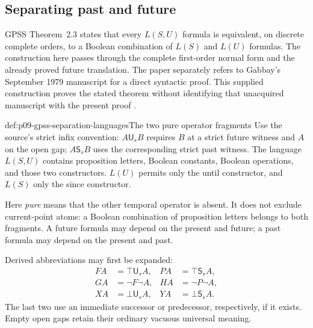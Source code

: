 
\subsection{Separating past and future}
\label{sec:p09-gpss-past-future-separation}

GPSS Theorem~2.3 states that every \(L(S,U)\) formula is
equivalent, on discrete complete orders, to a Boolean
combination of \(L(S)\) and \(L(U)\) formulas. The
construction here passes through the complete first-order
normal form and the already proved future translation.
The paper separately refers to Gabbay's September 1979
manuscript for a direct syntactic proof. This supplied
construction proves the stated theorem without identifying
that unacquired manuscript with the present proof
\cite[Theorem~2.3 and its referral, p.~170; reference G2, p.~173]{GabbayPnueliShelahStavi1980}.

\begin{hbdefinition}{def:p09-gpss-separation-languages}{The two pure operator fragments}
Use the source's strict infix convention:
\(A\mathbin{\mathsf U_s}B\) requires \(B\) at a
strict future witness and \(A\) on the open gap;
\(A\mathbin{\mathsf S_s}B\) uses the corresponding
strict past witness. The language \(L(S,U)\)
contains proposition letters, Boolean constants,
Boolean operations, and those two constructors.
\(L(U)\) permits only the until constructor,
and \(L(S)\) only the since constructor.

Here \emph{pure} means that the other temporal
operator is absent. It does not exclude current-point
atoms: a Boolean combination of proposition letters
belongs to both fragments. A future formula may
depend on the present and future; a past formula
may depend on the present and past.

Derived abbreviations may first be expanded:
\[
\begin{aligned}
 FA&=\top\mathbin{\mathsf U_s}A,&
 PA&=\top\mathbin{\mathsf S_s}A,\\
 GA&=\neg F\neg A,&
 HA&=\neg P\neg A,\\
 XA&=\bot\mathbin{\mathsf U_s}A,&
 YA&=\bot\mathbin{\mathsf S_s}A.
\end{aligned}
\]
The last two use an immediate successor or predecessor,
respectively, if it exists. Empty open gaps retain
their ordinary vacuous universal meaning.
\end{hbdefinition}

